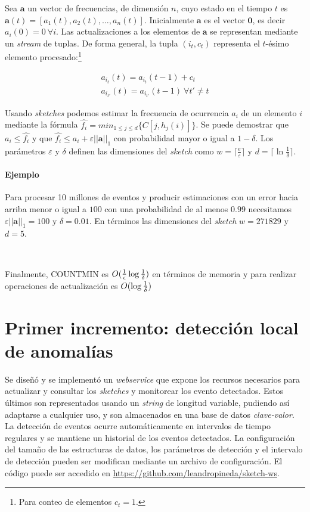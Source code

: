 \documentclass[a4paper,10pt, oneside]{article}
\begin{document}
Sea $\mathbf{a}$ un vector de frecuencias, de dimensión $n$, cuyo estado en el tiempo $t$ es $\mathbf{a}(t)=[a_1(t), a_2(t), \dots, a_n(t)]$. Inicialmente $\mathbf{a}$ es el vector $\mathbf{0}$, es decir $a_i(0)=0 \ \forall i$. Las actualizaciones a los elementos de $\mathbf{a}$ se representan mediante un \textit{stream} de tuplas. De forma general, la tupla $(i_t, c_t)$ representa el $t$-ésimo elemento procesado:\footnote{Para conteo de elementos $c_t=1$.}

\begin{gather*}
a_{i_t}(t)=a_{i_t}(t-1) + c_t\\
a_{i_{t'}}(t)=a_{i_{t'}}(t-1) \ \forall t' \neq t 
\end{gather*}

Usando \textit{sketches} podemos estimar la frecuencia de ocurrencia $a_i$ de un elemento $i$ mediante la fórmula $\hat{f_i} = min_{1 \leq j \leq d}\{C[j,h_j(i)]\}$. Se puede demostrar que $a_i \leq \hat{f_i}$ y que $\hat{f_i} \leq a_i + \varepsilon ||\mathbf{a}||_1$ con probabilidad mayor o igual a $1-\delta$. Los parámetros $\varepsilon$ y $\delta$ definen las dimensiones del \textit{sketch} como $w=\lceil \frac{e}{\varepsilon}\rceil$ y $d=\lceil \ln \frac{1}{\delta} \rceil$.

\paragraph{Ejemplo} Para procesar 10 millones de eventos y producir estimaciones con un error hacia arriba menor o igual a $100$ con una probabilidad de al menos $0.99$ necesitamos $\varepsilon ||\mathbf{a}||_1=100$ y $\delta = 0.01$. En términos las dimensiones del \textit{sketch} $w=271829$ y $d=5$.

\

Finalmente, COUNTMIN es $O({1 \over \epsilon} \log {1 \over \delta})$ en términos de memoria y para realizar operaciones de actualización es $O(\log {1 \over \delta})$

\section{Primer incremento: detección local de anomalías}
Se diseñó y se implementó un \textit{webservice} que expone los recursos necesarios para actualizar y consultar los \textit{sketches} y monitorear los evento detectados. Estos últimos son representados usando un \textit{string} de longitud variable, pudiendo así adaptarse a cualquier uso, y son almacenados en una base de datos \textit{clave-valor}. La detección de eventos ocurre automáticamente en intervalos de tiempo regulares y se mantiene un historial de los eventos detectados. La configuración del tamaño de las estructuras de datos, los parámetros de detección y el intervalo de detección pueden ser modifican mediante un archivo de configuración.
El código puede ser accedido en \url{https://github.com/leandropineda/sketch-ws}.
\end{document}
